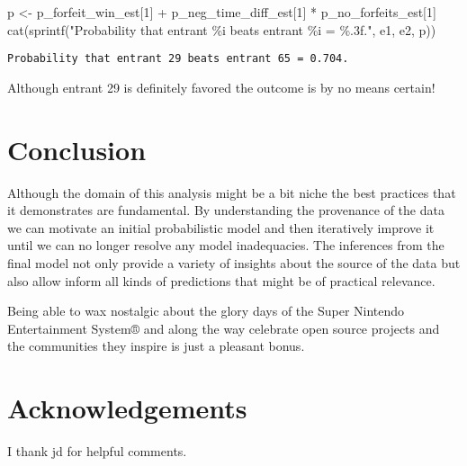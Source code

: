 \documentclass[
  letterpaper,
  DIV=11,
  numbers=noendperiod]{scrartcl}
\newenvironment{Shaded}{\begin{snugshade}}{\end{snugshade}}
\newcommand{\DecValTok}[1]{\textcolor[rgb]{0.68,0.00,0.00}{#1}}
\newcommand{\FunctionTok}[1]{\textcolor[rgb]{0.28,0.35,0.67}{#1}}
\newcommand{\NormalTok}[1]{\textcolor[rgb]{0.00,0.23,0.31}{#1}}
\newcommand{\OtherTok}[1]{\textcolor[rgb]{0.00,0.23,0.31}{#1}}
\newcommand{\SpecialCharTok}[1]{\textcolor[rgb]{0.37,0.37,0.37}{#1}}
\newcommand{\StringTok}[1]{\textcolor[rgb]{0.13,0.47,0.30}{#1}}
\begin{document}
\begin{Shaded}
\begin{Highlighting}[]
\NormalTok{p }\OtherTok{\textless{}{-}}\NormalTok{ p\_forfeit\_win\_est[}\DecValTok{1}\NormalTok{] }\SpecialCharTok{+}\NormalTok{ p\_neg\_time\_diff\_est[}\DecValTok{1}\NormalTok{] }\SpecialCharTok{*}\NormalTok{ p\_no\_forfeits\_est[}\DecValTok{1}\NormalTok{]}
\FunctionTok{cat}\NormalTok{(}\FunctionTok{sprintf}\NormalTok{(}\StringTok{"Probability that entrant \%i beats entrant \%i = \%.3f."}\NormalTok{,}
\NormalTok{            e1, e2, p))}
\end{Highlighting}
\end{Shaded}

\begin{verbatim}
Probability that entrant 29 beats entrant 65 = 0.704.
\end{verbatim}

Although entrant 29 is definitely favored the outcome is by no means
certain!

\section{Conclusion}\label{conclusion}

Although the domain of this analysis might be a bit niche the best
practices that it demonstrates are fundamental. By understanding the
provenance of the data we can motivate an initial probabilistic model
and then iteratively improve it until we can no longer resolve any model
inadequacies. The inferences from the final model not only provide a
variety of insights about the source of the data but also allow inform
all kinds of predictions that might be of practical relevance.

Being able to wax nostalgic about the glory days of the Super Nintendo
Entertainment System® and along the way celebrate open source projects
and the communities they inspire is just a pleasant bonus.

\section*{Acknowledgements}\label{acknowledgements}

I thank jd for helpful comments.
\end{document}
